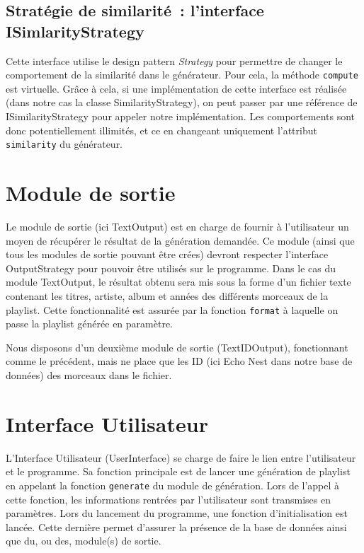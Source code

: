 \subsection{Stratégie de similarité~: l'interface ISimlarityStrategy}
\label{archi:generation:similarity}

Cette interface utilise le design pattern \emph{Strategy} pour permettre de
changer le comportement de la similarité dans le générateur. Pour cela,
la méthode \texttt{compute} est virtuelle. Grâce à cela, si une implémentation
de cette interface est réalisée (dans notre cas la classe SimilarityStrategy),
on peut passer par une référence de ISimilarityStrategy pour appeler notre
implémentation. Les comportements sont donc potentiellement illimités, et ce
en changeant uniquement l'attribut \texttt{similarity} du générateur.

\section{Module de sortie}
\label{archi:sortie}

Le module de sortie (ici TextOutput) est en charge de fournir à 
l'utilisateur un moyen de récupérer le résultat de la génération demandée. 
Ce module (ainsi que tous les modules de sortie pouvant être crées) devront 
respecter l'interface OutputStrategy pour pouvoir être utilisés sur le 
programme. Dans le cas du module TextOutput, le résultat obtenu sera mis 
sous la forme d'un fichier texte contenant les titres, artiste, album et années 
des différents morceaux de la playlist. Cette fonctionnalité est assurée par la fonction 
\texttt{format} à laquelle on passe la playlist générée en paramètre.

Nous disposons d'un deuxième module de sortie (TextIDOutput), fonctionnant comme
le précédent, mais ne place que les ID (ici Echo Nest dans notre base de données)
des morceaux dans le fichier.

\section{Interface Utilisateur}
\label{archi:interface}

L'Interface Utilisateur (UserInterface) se charge de faire le lien entre
l'utilisateur et le programme. Sa fonction principale est de lancer une
génération de playlist en appelant la fonction \texttt{generate} du module de 
génération. Lors de l'appel à cette fonction, les informations rentrées par 
l'utilisateur sont transmises en paramètres. Lors du lancement du programme,
une fonction d'initialisation est lancée. Cette dernière permet d'assurer 
la présence de la base de données ainsi que du, ou des, module(s) de sortie.

